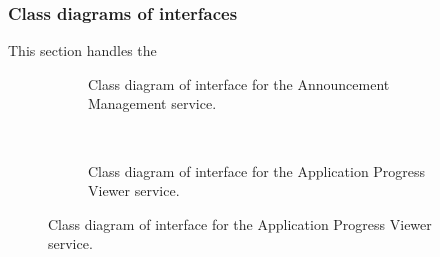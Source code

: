\documentclass[12pt]{article}
\begin{document}
\newpage
\subsubsection{Class diagrams of interfaces}
This section handles the 
\begin{figure}[p]

\begin{subfigure}[p]{0.47\textwidth}
\centering	
{}
\caption{Class diagram of interface for the Announcement Management service.}
\end{subfigure}
~
\begin{subfigure}[p]{0.47\textwidth}
\centering	
{}
\caption{Class diagram of interface for the Application Progress Viewer service.}
\end{subfigure}


\end{figure}
\end{document}
